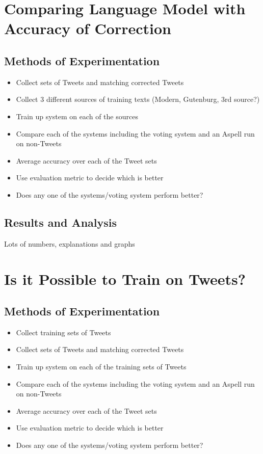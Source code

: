 \section{Comparing Language Model with Accuracy of Correction}
\subsection{Methods of Experimentation}
\begin{itemize}
	\item Collect sets of Tweets and matching corrected Tweets
	\item Collect 3 different sources of training texts (Modern, Gutenburg, 3rd source?)
	\item Train up system on each of the sources
	\item Compare each of the systems including the voting system and an Aspell run on non-Tweets
	\item Average accuracy over each of the Tweet sets
	\item Use evaluation metric to decide which is better
	\item Does any one of the systems/voting system perform better?
\end{itemize}

\subsection{Results and Analysis}
Lots of numbers, explanations and graphs

\section{Is it Possible to Train on Tweets?}
\subsection{Methods of Experimentation}
\begin{itemize}
	\item Collect training sets of Tweets
	\item Collect sets of Tweets and matching corrected Tweets
	\item Train up system on each of the training sets of Tweets
	\item Compare each of the systems including the voting system and an Aspell run on non-Tweets
	\item Average accuracy over each of the Tweet sets
	\item Use evaluation metric to decide which is better
	\item Does any one of the systems/voting system perform better?
\end{itemize}

